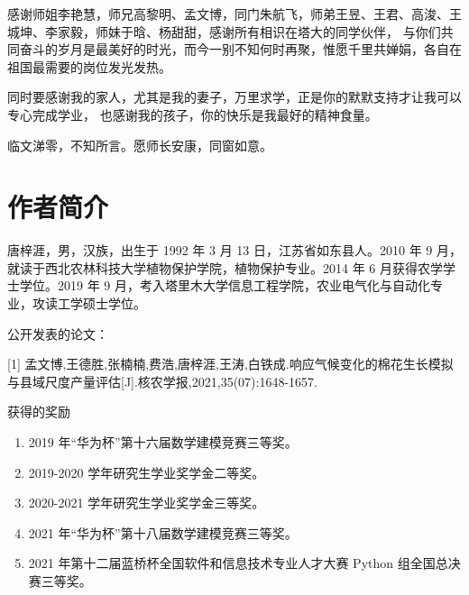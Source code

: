 \documentclass[a4paper,oneside,zihao=-4,AutoFakeBold,fontset=windows]{ctexbook}
\begin{document}
\begin{spacing}{}
  感谢师姐李艳慧，师兄高黎明、孟文博，同门朱航飞，师弟王昱、王君、高浚、王城坤、李家毅，师妹于晗、杨甜甜，感谢所有相识在塔大的同学伙伴，%
  与你们共同奋斗的岁月是最美好的时光，而今一别不知何时再聚，惟愿千里共婵娟，各自在祖国最需要的岗位发光发热。%

  同时要感谢我的家人，尤其是我的妻子，万里求学，正是你的默默支持才让我可以专心完成学业，%
  也感谢我的孩子，你的快乐是我最好的精神食量。%

  临文涕零，不知所言。愿师长安康，同窗如意。

  \chapter*{作者简介}
  唐梓涯，男，汉族，出生于 1992 年 3 月 13 日，江苏省如东县人。2010 年 9 月，就读于西北农林科技大学植物保护学院，植物保护专业。2014 年 6 月获得农学学士学位。2019 年 9 月，考入塔里木大学信息工程学院，农业电气化与自动化专业，攻读工学硕士学位。

  公开发表的论文：

  [1] 孟文博,王德胜,张楠楠,费浩,唐梓涯,王涛,白铁成.响应气候变化的棉花生长模拟与县域尺度产量评估[J].核农学报,2021,35(07):1648-1657.

  获得的奖励
  \begin{enumerate}
    \item 2019 年“华为杯”第十六届数学建模竞赛三等奖。
    \item 2019{-}2020 学年研究生学业奖学金二等奖。
    \item 2020{-}2021 学年研究生学业奖学金三等奖。
    \item 2021 年“华为杯”第十八届数学建模竞赛三等奖。
    \item 2021 年第十二届蓝桥杯全国软件和信息技术专业人才大赛 Python 组全国总决赛三等奖。
  \end{enumerate}
\end{spacing}
\end{document}

